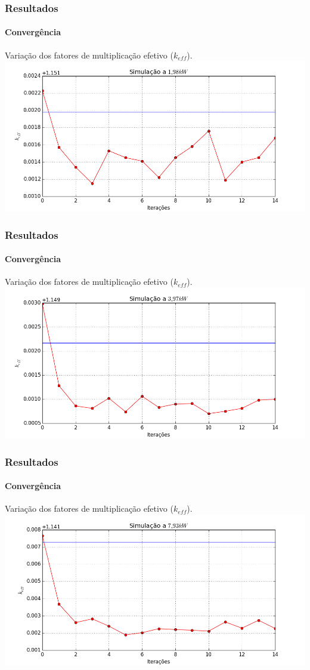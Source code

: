 \documentclass[svgnames,smaller,table]{beamer}
\begin{document}
\begin{frame}
  \frametitle{Resultados}
  \framesubtitle{Convergência}
  Variação dos fatores de multiplicação efetivo ($k_{eff}$).
  \centering\includegraphics[scale=0.45]{../figuras/plot50.png}
  \label{fig:keff50}
\end{frame}

\begin{frame}
  \frametitle{Resultados}
  \framesubtitle{Convergência}
  Variação dos fatores de multiplicação efetivo ($k_{eff}$).
  \centering\includegraphics[scale=0.45]{../figuras/plot100.png}
  \label{fig:keff100}
\end{frame}

\begin{frame}
  \frametitle{Resultados}
  \framesubtitle{Convergência}
  Variação dos fatores de multiplicação efetivo ($k_{eff}$).
  \centering\includegraphics[scale=0.45]{../figuras/plot200.png}
  \label{fig:keff200}
\end{frame}
\end{document}
